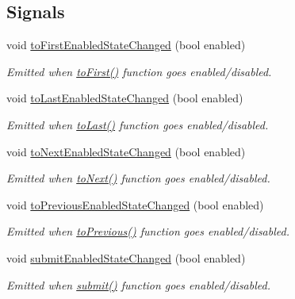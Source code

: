 \subsection*{Signals}
\begin{DoxyCompactItemize}
\item 
void \hyperlink{classmdt_abstract_sql_widget_acc3e3e7e848a92a4a117f7147bc1f3c5}{to\-First\-Enabled\-State\-Changed} (bool enabled)
\begin{DoxyCompactList}\small\item\em Emitted when \hyperlink{classmdt_abstract_sql_widget_aaa27731864dbb9123ec6765dd21feb7f}{to\-First()} function goes enabled/disabled. \end{DoxyCompactList}\item 
void \hyperlink{classmdt_abstract_sql_widget_a9b7e32907ed336c74746f7a5c6d87d92}{to\-Last\-Enabled\-State\-Changed} (bool enabled)
\begin{DoxyCompactList}\small\item\em Emitted when \hyperlink{classmdt_abstract_sql_widget_a681cc6234976eaa2f0e158248569b502}{to\-Last()} function goes enabled/disabled. \end{DoxyCompactList}\item 
void \hyperlink{classmdt_abstract_sql_widget_a388c169696cea80ac170b0ee060e4c9f}{to\-Next\-Enabled\-State\-Changed} (bool enabled)
\begin{DoxyCompactList}\small\item\em Emitted when \hyperlink{classmdt_abstract_sql_widget_a8ed6bb811c992fcc8bba8da9f675cd88}{to\-Next()} function goes enabled/disabled. \end{DoxyCompactList}\item 
void \hyperlink{classmdt_abstract_sql_widget_acf241c34dcca6d283c8c1bf297841766}{to\-Previous\-Enabled\-State\-Changed} (bool enabled)
\begin{DoxyCompactList}\small\item\em Emitted when \hyperlink{classmdt_abstract_sql_widget_a342b13a8258536d228f8522dae2b9df7}{to\-Previous()} function goes enabled/disabled. \end{DoxyCompactList}\item 
void \hyperlink{classmdt_abstract_sql_widget_acacc59096ae48f733be577a96cd2d14a}{submit\-Enabled\-State\-Changed} (bool enabled)
\begin{DoxyCompactList}\small\item\em Emitted when \hyperlink{classmdt_abstract_sql_widget_a6678c45b0d46eb163f5b09d79ed001b5}{submit()} function goes enabled/disabled. \end{DoxyCompactList}\item 

\end{DoxyCompactItemize}
